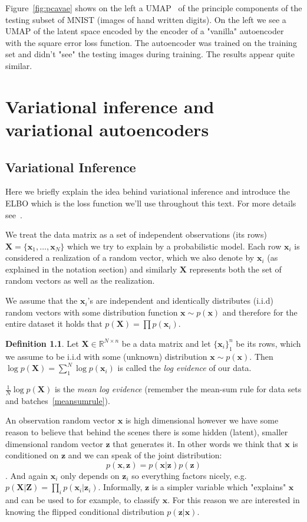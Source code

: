 \documentclass[11pt, a4paper]{report}
\theoremstyle{plain}
\theoremstyle{definition}
\newtheorem{mydef}{Definition}[chapter]
\theoremstyle{remark}
\newcommand{\R}{\mathbb{R}}
\newcommand{\X}{\mathbf{X}}
\newcommand{\x}{\mathbf{x}}
\newcommand{\Z}{\mathbf{Z}}
\newcommand{\z}{\mathbf{z}}
\newcommand{\bv}[1]{\boldsymbol{#1}}
\begin{document}
Figure~\ref{fig:pcavae} shows on the left a
UMAP~\cite{mcinnes2018umap} of the principle components of the testing subset of
MNIST (images of hand written digits). On the left we see a UMAP of the latent
space encoded by the encoder of a "vanilla" autoencoder with the square error loss
function. The autoencoder was
trained on the training set and didn't "see" the testing images during training.
The results appear quite similar.

\chapter{Variational inference and variational autoencoders}
\section{Variational Inference}

Here we briefly explain the idea behind variational inference and introduce the
ELBO which is the loss function we'll use throughout this text.
For more details see~\cite{bishop2006pattern}.

We treat the data matrix as a set of independent observations (its rows) $\bv{X}
= \{\bv{x}_1, \dots , \bv{x}_N\}$ which we try to explain by a probabilistic
model. Each row $\x_i$ is considered a realization of a random vector, which we
also denote by $\x_i$ (as explained in the notation section) and similarly $\X$
represents both the set of random vectors as well as the realization.

We assume that the $\bv{x}_i$'s are independent and identically distributes
(i.i.d) random vectors with some distribution function $\x \sim p(\x)$ and
therefore for the entire dataset it holds that $p(\bv{X}) = \prod p(\bv{x}_i)$.

\begin{mydef}
\label{def:logevidence}
Let $\bv{X} \in \R^{N \times n}$ be a data matrix and let $\{\bv{x}_i\}_1^n$ be its
rows,
which we assume to be i.i.d with some (unknown) distribution $\x \sim p(\bv{x})$.
Then $\log p(\bv{X}) = \sum_1^N \log p(\bv{x}_i)$ is called the \emph{log evidence} of our
data.

$\frac{1}{N}\log p(\X)$ is the \emph{mean log evidence} (remember the
mean-sum rule for data sets and
batches~\ref{meansumrule}).
\end{mydef}

An observation random vector $\bv{x}$ is high dimensional however we have some
reason to believe that behind the scenes there is some hidden (latent), smaller
dimensional random vector $\z$ that generates it. In other words we think that
$\x$ is conditioned on $\z$ and we can speak of the joint distribution:
$$p(\x,\z) = p(\x | \z)p(\z)$$. And again $\x_i$ only depends on $\z_i$ so
everything factors nicely, e.g.\label{nicefactor} $p(\X | \Z) = \prod_i p(\x_i | \z_i)$.
Informally, $\z$ is a simpler variable which "explains" $\x$ and can be used to
for example, to classify $\x$. For this reason we are interested in knowing the
flipped conditional distribution $p(\z | \x)$.
\end{document}
